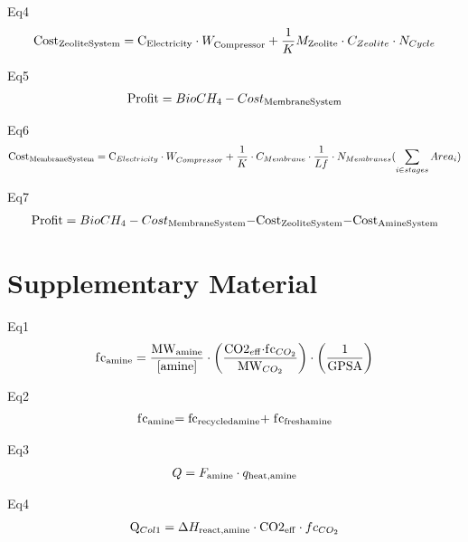 \documentclass[10pt,a4paper]{article}
\begin{document}
Eq4
\begin{align}
	{\rm{Cos}}{{\rm{t}}_{{\rm{Zeolite System}}}} = {{\rm{C}}_{{\rm{Electricity }}}}\cdot W_{{\rm{Compressor}}}^{} + \frac{1}{K}{M_{{\rm{Zeolite}}}}\cdot{C_{Zeolite}}\cdot{N_{Cycle}}
\end{align}

Eq5
\begin{align}
	{\rm{Profit}} = BioC{H_4} - Cos{t_{{\rm{Membrane System}}}}
\end{align}

Eq6
\begin{align}
	{\rm{Cos}}{{\rm{t}}_{{\rm{Membrane System}}}} = {{\rm{C}}_{Electricity{\rm{ }}}}\cdot W_{Compressor}^{} + \frac{1}{K}\cdot{C_{Membrane}}\cdot\frac{1}{{Lf}}\cdot{N_{Membranes}}(\sum\limits_{i \in stages} {Are{a_i}} )
\end{align}

Eq7
\begin{align}
	{\rm{Profit}} = BioC{H_4} - Cos{t_{{\rm{Membrane System}}}}{\rm{ - Cos}}{{\rm{t}}_{{\rm{Zeolite System}}}}{\rm{ - Cos}}{{\rm{t}}_{{\rm{Amine System}}}}
\end{align}

\section{Supplementary Material}

Eq1
\begin{align}
	{\rm{f}}{{\rm{c}}_{{\rm{amine}}}} = \frac{{{\rm{M}}{{\rm{W}}_{{\rm{amine}}}}}}{{\left[ {{\rm{amine}}} \right]}}\cdot\left( {\frac{{{\rm{CO}}{{\rm{2}}_{e{\rm{ff}}}}{\rm{\cdot f}}{{\rm{c}}_{C{O_2}}}}}{{{\rm{M}}{{\rm{W}}_{C{O_2}}}}}} \right)\cdot\left( {\frac{1}{{{\rm{GPSA}}}}} \right)
\end{align}

Eq2
\begin{align}
	{\rm{f}}{{\rm{c}}_{{\rm{amine}}}}{\rm{ =  fc}}{}_{{\rm{recycled amine}}}{\rm{  + \; f}}{{\rm{c}}_{{\rm{fresh amine}}}}{\rm{       }}
\end{align}

Eq3
\begin{align}
	Q = {F_{{\rm{amine}}}}\cdot{q_{{\rm{heat,amine}}}}
\end{align}

Eq4
\begin{align}
	{{\rm{Q}}_{Col1}} = \Delta {H_{{\rm{react, amine}}}} \cdot {\rm{CO}}{{\rm{2}}_{{\rm{eff}}}} \cdot f{c_{C{O_2}}}
\end{align}
\end{document}
